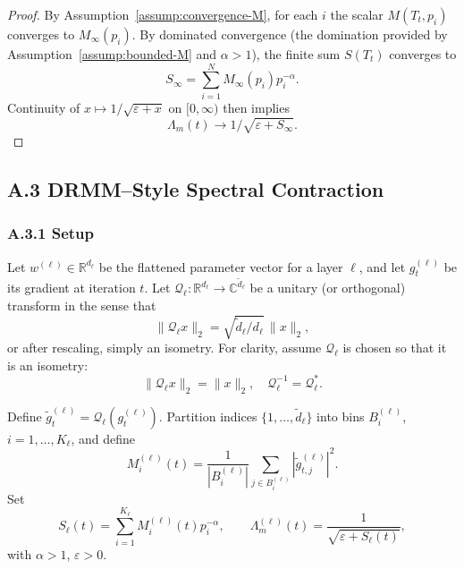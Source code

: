 \documentclass[11pt]{article}
\begin{document}
\begin{proof}
By Assumption~\ref{assump:convergence-M}, for each $i$ the scalar $M(T_t,p_i)$ converges to $M_\infty(p_i)$. By dominated convergence (the domination provided by Assumption~\ref{assump:bounded-M} and $\alpha>1$), the finite sum $S(T_t)$ converges to
\[
  S_\infty = \sum_{i=1}^N M_\infty(p_i)p_i^{-\alpha}.
\]
Continuity of $x\mapsto 1/\sqrt{\varepsilon+x}$ on $[0,\infty)$ then implies
\[
\Lambda_m(t) \to 1/\sqrt{\varepsilon+S_\infty}.
\]
\end{proof}

\subsection*{A.3 DRMM–Style Spectral Contraction}

\subsubsection*{A.3.1 Setup}

Let $w^{(\ell)} \in \mathbb{R}^{d_\ell}$ be the flattened parameter vector for a layer $\ell$, and let $g_t^{(\ell)}$ be its gradient at iteration $t$. Let $\mathcal{Q}_\ell : \mathbb{R}^{d_\ell} \to \mathbb{C}^{\tilde d_\ell}$ be a unitary (or orthogonal) transform in the sense that
\begin{equation}
  \|\mathcal{Q}_\ell x\|_2 = \sqrt{\tilde d_\ell / d_\ell}\,\|x\|_2,
\end{equation}
or after rescaling, simply an isometry. For clarity, assume $\mathcal{Q}_\ell$ is chosen so that it is an isometry:
\begin{equation}
  \|\mathcal{Q}_\ell x\|_2 = \|x\|_2,
  \quad \mathcal{Q}_\ell^{-1} = \mathcal{Q}_\ell^*.
\end{equation}

Define $\tilde g_t^{(\ell)} = \mathcal{Q}_\ell(g_t^{(\ell)})$. Partition indices $\{1,\dots,\tilde d_\ell\}$ into bins $B_i^{(\ell)}$, $i=1,\dots,K_\ell$, and define
\begin{equation}
  M_i^{(\ell)}(t)
  =
  \frac{1}{|B_i^{(\ell)}|}
  \sum_{j\in B_i^{(\ell)}} |\tilde g^{(\ell)}_{t,j}|^2.
\end{equation}
Set
\begin{equation}
  S_\ell(t)
  =
  \sum_{i=1}^{K_\ell} M_i^{(\ell)}(t)p_i^{-\alpha},
  \qquad
  \Lambda_m^{(\ell)}(t)
  =
  \frac{1}{\sqrt{\varepsilon + S_\ell(t)}},
\end{equation}
with $\alpha>1$, $\varepsilon>0$.
\end{document}
